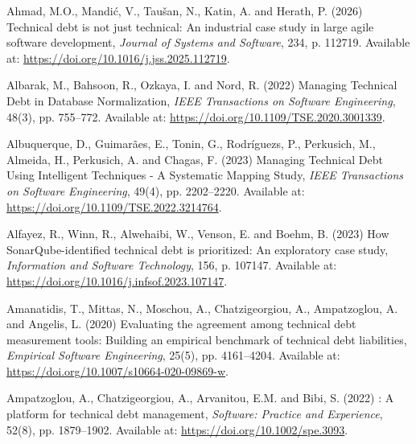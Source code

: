 \documentclass[
  british,
  12pt,
  a4paper,
]{report}
\newlength{\cslhangindent}
\newenvironment{CSLReferences}[2] %
 {\begin{list}{}{%
  \setlength{\itemindent}{0pt}
  \setlength{\leftmargin}{0pt}
  \setlength{\parsep}{0pt}
  \ifodd #1
   \setlength{\leftmargin}{\cslhangindent}
   \setlength{\itemindent}{-1\cslhangindent}
  \fi
  \setlength{\itemsep}{#2\baselineskip}}}
 {\end{list}}
\begin{document}

\label{refs}
\begin{CSLReferences}{0}{1}
Ahmad, M.O., Mandić, V., Taušan, N., Katin, A. and Herath, P. (2026)
\textquotesingle Technical debt is not just technical: {An} industrial
case study in large agile software development\textquotesingle,
\emph{Journal of Systems and Software}, 234, p. 112719. Available at:
\url{https://doi.org/10.1016/j.jss.2025.112719}.

Albarak, M., Bahsoon, R., Ozkaya, I. and Nord, R. (2022)
\textquotesingle Managing {Technical Debt} in {Database
Normalization}\textquotesingle, \emph{IEEE Transactions on Software
Engineering}, 48(3), pp. 755--772. Available at:
\url{https://doi.org/10.1109/TSE.2020.3001339}.

Albuquerque, D., Guimarães, E., Tonin, G., Rodríguezs, P., Perkusich,
M., Almeida, H., Perkusich, A. and Chagas, F. (2023)
\textquotesingle Managing {Technical Debt Using Intelligent Techniques}
- {A Systematic Mapping Study}\textquotesingle, \emph{IEEE Transactions
on Software Engineering}, 49(4), pp. 2202--2220. Available at:
\url{https://doi.org/10.1109/TSE.2022.3214764}.

Alfayez, R., Winn, R., Alwehaibi, W., Venson, E. and Boehm, B. (2023)
\textquotesingle How {SonarQube-identified} technical debt is
prioritized: {An} exploratory case study\textquotesingle,
\emph{Information and Software Technology}, 156, p. 107147. Available
at: \url{https://doi.org/10.1016/j.infsof.2023.107147}.

Amanatidis, T., Mittas, N., Moschou, A., Chatzigeorgiou, A.,
Ampatzoglou, A. and Angelis, L. (2020) \textquotesingle Evaluating the
agreement among technical debt measurement tools: Building an empirical
benchmark of technical debt liabilities\textquotesingle, \emph{Empirical
Software Engineering}, 25(5), pp. 4161--4204. Available at:
\url{https://doi.org/10.1007/s10664-020-09869-w}.

Ampatzoglou, A., Chatzigeorgiou, A., Arvanitou, E.M. and Bibi, S. (2022)
: {A} platform for technical debt
management\textquotesingle, \emph{Software: Practice and Experience},
52(8), pp. 1879--1902. Available at:
\url{https://doi.org/10.1002/spe.3093}.


\end{CSLReferences}
\end{document}
